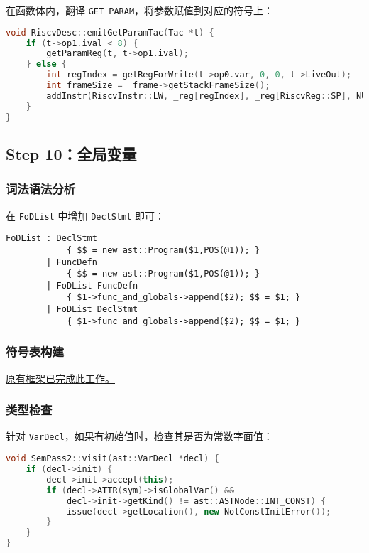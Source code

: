 \documentclass[a4paper]{article}
\begin{document}
在函数体内，翻译 \texttt{GET\_PARAM}，将参数赋值到对应的符号上：

\begin{lstlisting}[language=c++]
void RiscvDesc::emitGetParamTac(Tac *t) {
    if (t->op1.ival < 8) {
        getParamReg(t, t->op1.ival);
    } else {
        int regIndex = getRegForWrite(t->op0.var, 0, 0, t->LiveOut);
        int frameSize = _frame->getStackFrameSize();
        addInstr(RiscvInstr::LW, _reg[regIndex], _reg[RiscvReg::SP], NULL, (t->op1.ival - 8) * 4 - frameSize, EMPTY_STR, EMPTY_STR);
    }
}   
\end{lstlisting}

\subsection{Step 10：全局变量}

\subsubsection{词法语法分析}

在 \texttt{FoDList} 中增加 \texttt{DeclStmt} 即可：

\begin{lstlisting}[]
FoDList : DeclStmt
            { $$ = new ast::Program($1,POS(@1)); }
        | FuncDefn
            { $$ = new ast::Program($1,POS(@1)); }
        | FoDList FuncDefn
            { $1->func_and_globals->append($2); $$ = $1; }
        | FoDList DeclStmt
            { $1->func_and_globals->append($2); $$ = $1; }
\end{lstlisting}

\subsubsection{符号表构建}

\underline{原有框架已完成此工作。}

\subsubsection{类型检查}

针对 \texttt{VarDecl}，如果有初始值时，检查其是否为常数字面值：

\begin{lstlisting}[language=c++]
void SemPass2::visit(ast::VarDecl *decl) {
    if (decl->init) {
        decl->init->accept(this);
        if (decl->ATTR(sym)->isGlobalVar() &&
            decl->init->getKind() != ast::ASTNode::INT_CONST) {
            issue(decl->getLocation(), new NotConstInitError());
        }
    }
}
\end{lstlisting}
\end{document}
